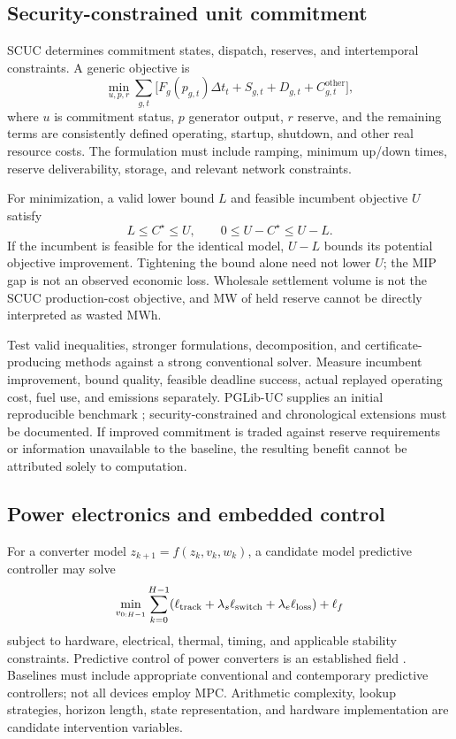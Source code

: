 \documentclass[11pt,letterpaper]{article}
\begin{document}
\subsection{Security-constrained unit commitment}
SCUC determines commitment states, dispatch, reserves, and intertemporal constraints. A generic objective is
\begin{equation}
\min_{u,p,r}\sum_{g,t}\big[F_g(p_{g,t})\Delta t_t+S_{g,t}+D_{g,t}+C^{\mathrm{other}}_{g,t}\big],
\end{equation}
where $u$ is commitment status, $p$ generator output, $r$ reserve, and the remaining terms are consistently defined operating, startup, shutdown, and other real resource costs. The formulation must include ramping, minimum up/down times, reserve deliverability, storage, and relevant network constraints.

For minimization, a valid lower bound $L$ and feasible incumbent objective $U$ satisfy
\begin{equation}
L\leq C^\star\leq U,\qquad 0\leq U-C^\star\leq U-L.
\end{equation}
If the incumbent is feasible for the identical model, $U-L$ bounds its potential objective improvement. Tightening the bound alone need not lower $U$; the MIP gap is not an observed economic loss. Wholesale settlement volume is not the SCUC production-cost objective, and MW of held reserve cannot be directly interpreted as wasted MWh.

Test valid inequalities, stronger formulations, decomposition, and certificate-producing methods against a strong conventional solver. Measure incumbent improvement, bound quality, feasible deadline success, actual replayed operating cost, fuel use, and emissions separately. PGLib-UC supplies an initial reproducible benchmark \cite{pglibuc}; security-constrained and chronological extensions must be documented. If improved commitment is traded against reserve requirements or information unavailable to the baseline, the resulting benefit cannot be attributed solely to computation.

\subsection{Power electronics and embedded control}
For a converter model $z_{k+1}=f(z_k,v_k,w_k)$, a candidate model predictive controller may solve
\begin{equation}
\min_{v_{0:H-1}}\sum_{k=0}^{H-1}
(\ell_{\rm track}+\lambda_s\ell_{\rm switch}+\lambda_e\ell_{\rm loss})+\ell_f
\end{equation}
subject to hardware, electrical, thermal, timing, and applicable stability constraints. Predictive control of power converters is an established field \cite{mpcbook}. Baselines must include appropriate conventional and contemporary predictive controllers; not all devices employ MPC. Arithmetic complexity, lookup strategies, horizon length, state representation, and hardware implementation are candidate intervention variables.
\end{document}
